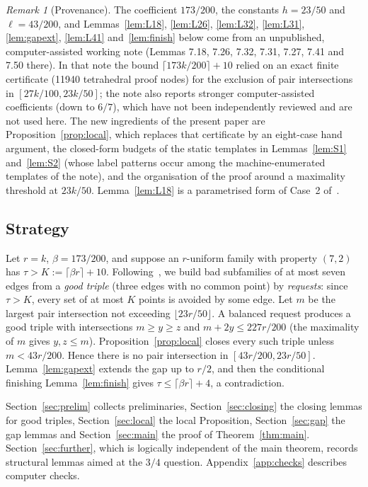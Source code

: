 \documentclass[11pt]{amsart}
\theoremstyle{definition}
\theoremstyle{remark}
\newtheorem{remark}[theorem]{Remark}
\newcommand{\ceil}[1]{\lceil #1\rceil}
\newcommand{\floor}[1]{\lfloor #1\rfloor}
\begin{document}
\begin{remark}[Provenance]\label{rem:prov}
The coefficient $173/200$, the constants $h=23/50$ and $\ell=43/200$, and Lemmas~\ref{lem:L18}, \ref{lem:L26}, \ref{lem:L32}, \ref{lem:L31}, \ref{lem:gapext}, \ref{lem:L41} and~\ref{lem:finish} below come from an unpublished, computer-assisted working note (Lemmas 7.18, 7.26, 7.32, 7.31, 7.27, 7.41 and 7.50 there). In that note the bound $\ceil{173k/200}+10$ relied on an exact finite certificate (11940 tetrahedral proof nodes) for the exclusion of pair intersections in $[27k/100,23k/50]$; the note also reports stronger computer-assisted coefficients (down to $6/7$), which have not been independently reviewed and are not used here. The new ingredients of the present paper are Proposition~\ref{prop:local}, which replaces that certificate by an eight-case hand argument, the closed-form budgets of the static templates in Lemmas~\ref{lem:S1} and~\ref{lem:S2} (whose label patterns occur among the machine-enumerated templates of the note), and the organisation of the proof around a maximality threshold at $23k/50$. Lemma~\ref{lem:L18} is a parametrised form of Case~2 of~\cite[Lemma~1]{FKW}.
\end{remark}

\subsection*{Strategy}
Let $r=k$, $\beta=173/200$, and suppose an $r$-uniform family with property $(7,2)$ has $\tau>K:=\ceil{\beta r}+10$. Following~\cite{FKW}, we build bad subfamilies of at most seven edges from a \emph{good triple} (three edges with no common point) by \emph{requests}: since $\tau>K$, every set of at most $K$ points is avoided by some edge. Let $m$ be the largest pair intersection not exceeding $\floor{23r/50}$. A balanced request produces a good triple with intersections $m\ge y\ge z$ and $m+2y\le227r/200$ (the maximality of $m$ gives $y,z\le m$). Proposition~\ref{prop:local} closes every such triple unless $m<43r/200$. Hence there is no pair intersection in $[43r/200,23r/50]$. Lemma~\ref{lem:gapext} extends the gap up to $r/2$, and then the conditional finishing Lemma~\ref{lem:finish} gives $\tau\le\ceil{\beta r}+4$, a contradiction.

Section~\ref{sec:prelim} collects preliminaries, Section~\ref{sec:closing} the closing lemmas for good triples, Section~\ref{sec:local} the local Proposition, Section~\ref{sec:gap} the gap lemmas and Section~\ref{sec:main} the proof of Theorem~\ref{thm:main}. Section~\ref{sec:further}, which is logically independent of the main theorem, records structural lemmas aimed at the $3/4$ question. Appendix~\ref{app:checks} describes computer checks.
\end{document}
